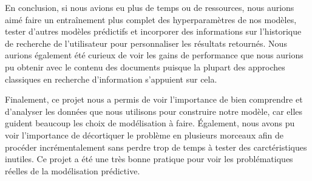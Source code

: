 En conclusion, si nous avions eu plus de temps ou de ressources, nous aurions aimé faire un entraînement plus complet des hyperparamètres de nos modèles, tester d'autres modèles prédictifs et incorporer des informations sur l'historique de recherche de l'utilisateur pour personnaliser les résultats retournés.
Nous aurions également été curieux de voir les gains de performance que nous aurions pu obtenir avec le contenu des documents puisque la plupart des approches classiques en recherche d'information s'appuient sur cela.


Finalement, ce projet nous a permis de voir l'importance de bien comprendre et d'analyser les données que nous utilisons pour construire notre modèle, car elles guident beaucoup les choix de modélisation à faire. Également, nous avons pu voir l'importance de décortiquer le problème en plusieurs morceaux afin de procéder incrémentalement sans perdre trop de temps à tester des carctéristiques inutiles. Ce projet a été une très bonne pratique pour voir les problématiques réelles de la modélisation prédictive.
